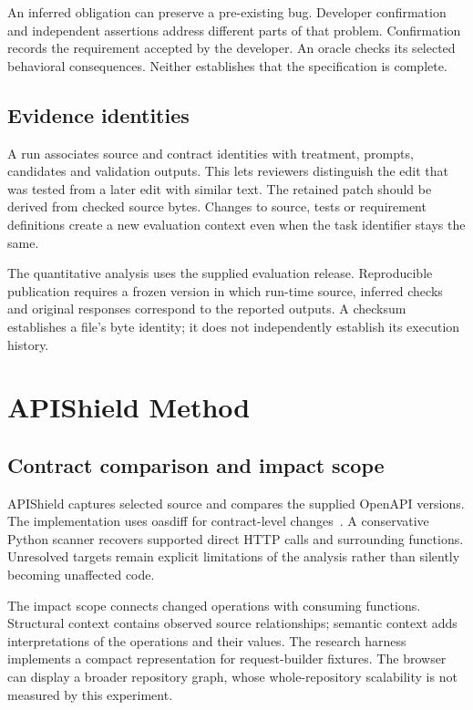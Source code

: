 An inferred obligation can preserve a pre-existing bug. Developer confirmation and independent assertions address different parts of that problem. Confirmation records the requirement accepted by the developer. An oracle checks its selected behavioral consequences. Neither establishes that the specification is complete.

\subsection{Evidence identities}
A run associates source and contract identities with treatment, prompts, candidates and validation outputs. This lets reviewers distinguish the edit that was tested from a later edit with similar text. The retained patch should be derived from checked source bytes. Changes to source, tests or requirement definitions create a new evaluation context even when the task identifier stays the same.

The quantitative analysis uses the supplied evaluation release. Reproducible publication requires a frozen version in which run-time source, inferred checks and original responses correspond to the reported outputs. A checksum establishes a file's byte identity; it does not independently establish its execution history.
\fi

\section{APIShield Method}
\subsection{Contract comparison and impact scope}
APIShield captures selected source and compares the supplied OpenAPI versions. The implementation uses oasdiff for contract-level changes~\cite{oasdiff}. A conservative Python scanner recovers supported direct HTTP calls and surrounding functions. Unresolved targets remain explicit limitations of the analysis rather than silently becoming unaffected code.

The impact scope connects changed operations with consuming functions. Structural context contains observed source relationships; semantic context adds interpretations of the operations and their values. The research harness implements a compact representation for request-builder fixtures. The browser can display a broader repository graph, whose whole-repository scalability is not measured by this experiment.

